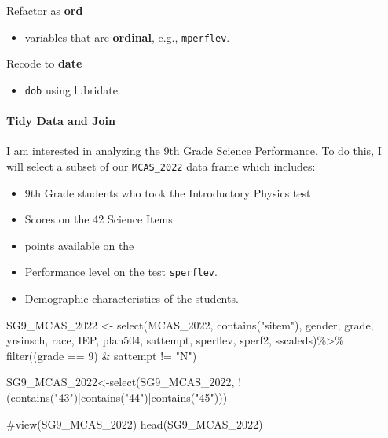 \documentclass[
  letterpaper,
  DIV=11,
  numbers=noendperiod]{scrartcl}
\let\oldparagraph\paragraph
\renewcommand{\paragraph}[1]{\oldparagraph{#1}\mbox{}}
\newenvironment{Shaded}{\begin{snugshade}}{\end{snugshade}}
\newcommand{\AttributeTok}[1]{\textcolor[rgb]{0.40,0.45,0.13}{#1}}
\newcommand{\CommentTok}[1]{\textcolor[rgb]{0.37,0.37,0.37}{#1}}
\newcommand{\DecValTok}[1]{\textcolor[rgb]{0.68,0.00,0.00}{#1}}
\newcommand{\FunctionTok}[1]{\textcolor[rgb]{0.28,0.35,0.67}{#1}}
\newcommand{\NormalTok}[1]{\textcolor[rgb]{0.00,0.23,0.31}{#1}}
\newcommand{\OtherTok}[1]{\textcolor[rgb]{0.00,0.23,0.31}{#1}}
\newcommand{\SpecialCharTok}[1]{\textcolor[rgb]{0.37,0.37,0.37}{#1}}
\newcommand{\StringTok}[1]{\textcolor[rgb]{0.13,0.47,0.30}{#1}}
\providecommand{\tightlist}{%
  \setlength{\itemsep}{0pt}\setlength{\parskip}{0pt}}\usepackage{longtable,booktabs,array}
\begin{document}
Refactor as \textbf{ord}

\begin{itemize}
\tightlist
\item
  variables that are \textbf{ordinal}, e.g., \texttt{mperflev}.
\end{itemize}

Recode to \textbf{date}

\begin{itemize}
\tightlist
\item
  \texttt{dob} using lubridate.
\end{itemize}

\hypertarget{tidy-data-and-join}{%
\paragraph{Tidy Data and Join}\label{tidy-data-and-join}}

I am interested in analyzing the 9th Grade Science Performance. To do
this, I will select a subset of our \texttt{MCAS\_2022} data frame which
includes:

\begin{itemize}
\tightlist
\item
  9th Grade students who took the Introductory Physics test
\item
  Scores on the 42 Science Items
\item
  points available on the
\item
  Performance level on the test \texttt{sperflev}.
\item
  Demographic characteristics of the students.
\end{itemize}

\begin{Shaded}
\begin{Highlighting}[]
\NormalTok{SG9\_MCAS\_2022 }\OtherTok{\textless{}{-}} \FunctionTok{select}\NormalTok{(MCAS\_2022, }\FunctionTok{contains}\NormalTok{(}\StringTok{"sitem"}\NormalTok{), gender, grade, yrsinsch,}
\NormalTok{                             race, IEP, }\StringTok{\textasciigrave{}}\AttributeTok{plan504}\StringTok{\textasciigrave{}}\NormalTok{, sattempt, sperflev, sperf2, sscaleds)}\SpecialCharTok{\%\textgreater{}\%}
                            \FunctionTok{filter}\NormalTok{((grade }\SpecialCharTok{==} \DecValTok{9}\NormalTok{) }\SpecialCharTok{\&}\NormalTok{ sattempt }\SpecialCharTok{!=} \StringTok{"N"}\NormalTok{)}

\NormalTok{SG9\_MCAS\_2022}\OtherTok{\textless{}{-}}\FunctionTok{select}\NormalTok{(SG9\_MCAS\_2022, }\SpecialCharTok{!}\NormalTok{(}\FunctionTok{contains}\NormalTok{(}\StringTok{"43"}\NormalTok{)}\SpecialCharTok{|}\FunctionTok{contains}\NormalTok{(}\StringTok{"44"}\NormalTok{)}\SpecialCharTok{|}\FunctionTok{contains}\NormalTok{(}\StringTok{"45"}\NormalTok{)))}


\CommentTok{\#view(SG9\_MCAS\_2022)}
\FunctionTok{head}\NormalTok{(SG9\_MCAS\_2022)}
\end{Highlighting}
\end{Shaded}
\end{document}
